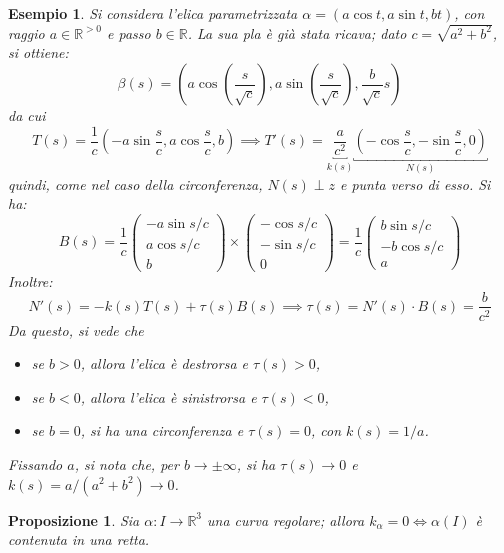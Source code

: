 \documentclass[12pt]{scrartcl}
\theoremstyle{style}
\newtheorem{esempio}{Esempio}[section]
\newtheorem{prop}{Proposizione}[section]
\numberwithin{equation}{subsection}
\begin{document}
\begin{esempio}
Si considera l'elica parametrizzata $\alpha = (a\cos t , a \sin t, bt)$, con raggio $a\in \mathbb{R}^{>0} $ e passo $b \in \mathbb{R}$.
La sua pla \`e gi\`a stata ricava; dato $c = \sqrt{a^2 + b^2} $, si ottiene:
\[
	\beta (s)= \left(a \cos \left(\frac{s}{\sqrt{c} }\right) , a\sin \left(\frac{s}{\sqrt{c} }\right),\frac{b}{\sqrt{c} } s\right)
\] 
da cui
\[
	T(s) = \frac{1}{c}\left(-a \sin \frac{s}{c}, a \cos \frac{s}{c}, b\right) \implies T'(s) = \underbracket{\frac{a}{c^2}}_{k(s)} \underbracket{\left(-\cos \frac{s}{c},- \sin \frac{s}{c},0\right) }_{N(s)} 
\] 
quindi, come nel caso della circonferenza, $N(s)\perp z$ e punta verso di esso.
Si ha:
\[
B(s) = \frac{1}{c} \begin{pmatrix} - a \sin s / c\\ a \cos s / c\\ b  \end{pmatrix} \times \begin{pmatrix} - \cos s / c \\ - \sin s / c \\ 0  \end{pmatrix} = \frac{1}{c} \begin{pmatrix} b \sin s / c \\ - b \cos  s / c \\ a  \end{pmatrix} 
\] 
Inoltre:
\[
	N'(s) = - k(s) T(s) +\tau (s) B(s) \implies \tau (s) = N'(s) \cdot B(s) =  \frac{b}{c^2}
\] 
Da questo, si vede che
\begin{itemize}
	\item se $b>0$, allora l'elica \`e destrorsa e $\tau (s) >0$,
	\item se $b<0$, allora l'elica \`e sinistrorsa e $\tau (s) < 0 $,
	\item se $b=0$, si ha una circonferenza e $\tau (s) = 0 $, con $k(s) = 1 / a$.
\end{itemize}
Fissando $a$, si nota che, per $b \to \pm \infty$, si ha $\tau (s) \to 0$ e $k(s) = a / (a^2 + b^2) \to 0 $.
\end{esempio}
\begin{prop}
	Sia $\alpha  : I \to \mathbb{R}^3$ una curva regolare; allora $k_\alpha = 0 \iff \alpha (I)$ \`e contenuta in una retta.
\end{prop}
\end{document}
